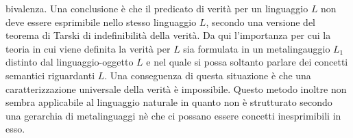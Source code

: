 bivalenza. Una conclusione \`e che il predicato di verit\`a per un linguaggio $L$ non deve essere esprimibile nello stesso linguaggio $L$, secondo una versione del teorema di Tarski di indefinibilit\`a della 
verit\`a. Da qui l'importanza per cui la teoria in cui viene definita la verit\`a per $L$ sia formulata in un metalingauggio $L_1$ distinto dal linguaggio-oggetto $L$ e nel quale si possa soltanto parlare dei concetti 
semantici riguardanti $L$. Una conseguenza di questa situazione \`e che una caratterizzazione universale della verit\`a \`e impossibile. Questo metodo inoltre non sembra applicabile al linguaggio naturale in 
quanto non \`e strutturato secondo una gerarchia di metalinguaggi n\`e che ci possano essere concetti inesprimibili in esso. 